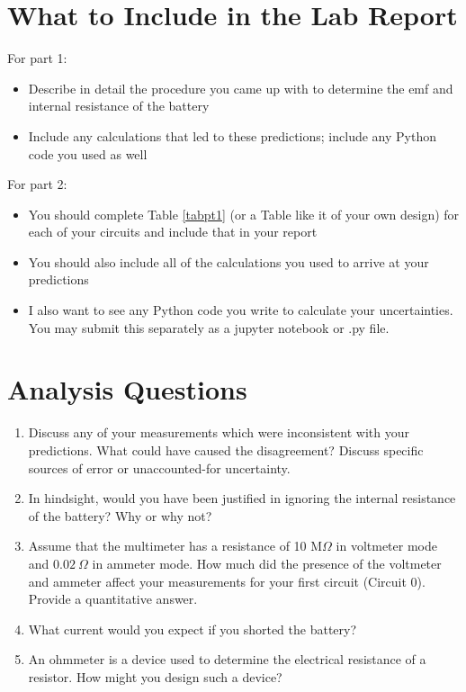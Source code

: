 \documentclass[12pt]{article}
\begin{document}
	\section*{What to Include in the Lab Report}
	For part 1:
	\begin{itemize}
		\item Describe in detail the procedure you came up with to determine the emf and internal resistance of the battery
		\item Include any calculations that led to these predictions; include any Python code you used as well
	\end{itemize}
	For part 2:
	\begin{itemize}
		\item You should complete Table \ref{tabpt1} (or a Table like it of your own design) for each of your circuits and include that in your report
		\item You should also include all of the calculations you used to arrive at your predictions
		\item I also want to see any Python code you write to calculate your uncertainties. You may submit this separately as a jupyter notebook or .py file.
	\end{itemize}
	
	\section*{Analysis Questions}
	\begin{enumerate}
		\item Discuss any of your measurements which were inconsistent with your predictions. What could have caused the disagreement? Discuss specific sources of error or unaccounted-for uncertainty.
		\item In hindsight, would you have been justified in ignoring the internal resistance of the battery? Why or why not?
		\item Assume that the multimeter has a resistance of 10 M$\Omega$ in voltmeter mode and $0.02\ \Omega$ in ammeter mode. How much did the presence of the voltmeter and ammeter affect your measurements for your first circuit (Circuit 0). Provide a quantitative answer.
		\item What current would you expect if you shorted the battery?
		\item An ohmmeter is a device used to determine the electrical resistance of a resistor. How might you design such a device?
	\end{enumerate}
	\newpage
\noindent\makebox[\linewidth]{\rule{.9\paperwidth}{0.4pt}}
\end{document}
